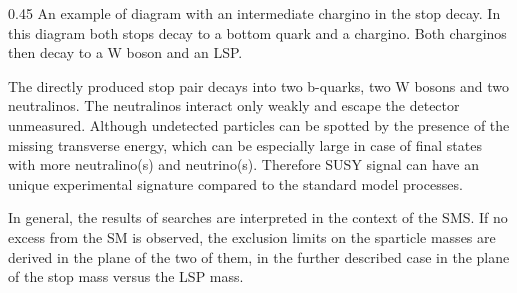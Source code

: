                  {0.45}       %
                 {An example of diagram with an intermediate chargino in the stop decay. In this diagram both stops decay to a bottom quark and a chargino. Both charginos then decay to a W boson and an LSP.   } %

The directly produced stop pair decays into two b-quarks, two W bosons and two neutralinos. The neutralinos interact only weakly and escape the detector unmeasured. Although undetected particles can be spotted by the presence of the missing transverse energy, which can be especially large in case of final states with more neutralino(s) and neutrino(s). Therefore SUSY signal can have an unique experimental signature compared to the standard model processes.

In general, the results of searches are interpreted in the context of the SMS. If no excess from the SM is observed, the exclusion limits on the sparticle masses are derived in the plane of the two of them, in the further described case in the plane of the stop mass versus the LSP mass.





